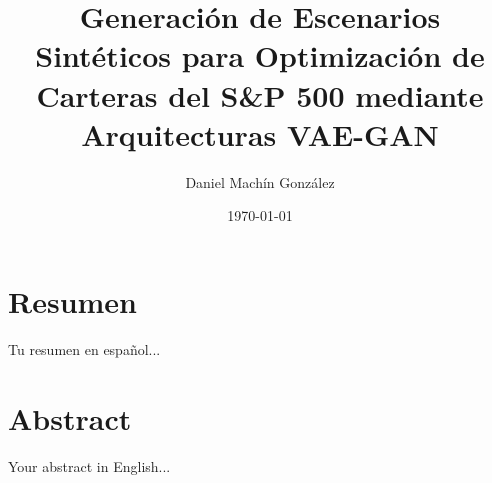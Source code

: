 \documentclass[11pt,a4paper,spanish]{book}
\title{Generación de Escenarios Sintéticos para Optimización de Carteras del S\&P 500 mediante Arquitecturas VAE-GAN}
\author{Daniel Machín González}
\date{\today}
\begin{document}
\maketitle

\frontmatter
\tableofcontents
\listoffigures
\listoftables

\chapter{Resumen}
Tu resumen en español...
\chapter{Abstract}
Your abstract in English...

\mainmatter



 








\backmatter


\end{document}
